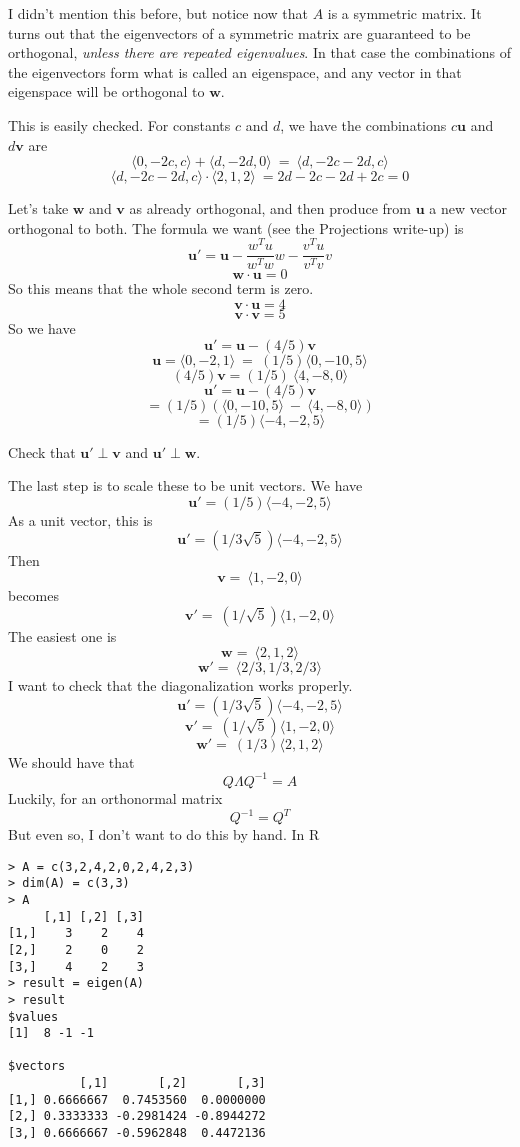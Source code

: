 \documentclass[11pt, oneside]{article}
\begin{document}
I didn't mention this before, but notice now that $A$ is a symmetric matrix.  It turns out that the eigenvectors of a symmetric matrix are guaranteed to be orthogonal, \emph{unless there are repeated eigenvalues}.  In that case the combinations of the eigenvectors form what is called an eigenspace, and any vector in that eigenspace will be orthogonal to $\mathbf{w}$.  

This is easily checked.  For constants $c$ and $d$, we have the combinations $c\mathbf{u}$ and $d\mathbf{v}$ are
\[  \langle 0,-2c,c \rangle  +  \langle d,-2d,0 \rangle  \ = \  \langle d,-2c-2d,c \rangle  \]
\[  \langle d,-2c-2d,c \rangle  \cdot  \langle 2,1,2 \rangle  \ = 2d - 2c - 2d + 2c = 0\]

Let's take $\mathbf{w}$ and $\mathbf{v}$ as already orthogonal, and then produce from $\mathbf{u}$ a new vector orthogonal to both.  The formula we want (see the Projections write-up) is
\[ \mathbf{u'} = \mathbf{u} - \frac{w^Tu}{w^Tw}w - \frac{v^Tu}{v^Tv}v \]
\[ \mathbf{w} \cdot \mathbf{u} = 0 \]
So this means that the whole second term is zero.
\[ \mathbf{v} \cdot \mathbf{u} = 4 \]
\[ \mathbf{v} \cdot \mathbf{v} = 5 \]
So we have
\[ \mathbf{u'} = \mathbf{u} - (4/5) \mathbf{v} \]
\[ \mathbf{u} =  \langle 0,-2,1 \rangle  \ = \ (1/5)  \langle 0,-10,5 \rangle  \]
\[ (4/5)\mathbf{v} = (1/5) \  \langle 4,-8,0 \rangle   \]
\[ \mathbf{u'} = \mathbf{u} - (4/5) \mathbf{v} \]
\[ = (1/5)( \langle 0,-10,5 \rangle \ -\  \langle 4,-8,0 \rangle ) \]
\[ = (1/5)  \langle -4,-2,5 \rangle  \]

Check that $\mathbf{u'} \perp \mathbf{v}$ and $\mathbf{u'} \perp \mathbf{w}$.

The last step is to scale these to be unit vectors.  We have 
\[ \mathbf{u'} = (1/5)  \langle -4,-2,5 \rangle  \]
As a unit vector, this is
\[ \mathbf{u'} = (1/3\sqrt{5})  \langle -4,-2,5 \rangle  \]
Then
\[ \mathbf{v} = \  \langle 1,-2,0 \rangle  \]
becomes
\[ \mathbf{v'} = \ (1/\sqrt{5})  \langle 1,-2,0 \rangle  \]
The easiest one is 
\[ \mathbf{w} = \  \langle 2,1,2 \rangle   \]
\[ \mathbf{w'} = \  \langle 2/3,1/3,2/3 \rangle   \]
I want to check that the diagonalization works properly.
\[ \mathbf{u'} = (1/3\sqrt{5})  \langle -4,-2,5 \rangle  \]
\[ \mathbf{v'} = \ (1/\sqrt{5})  \langle 1,-2,0 \rangle  \]
\[ \mathbf{w'} = \ (1/3)  \langle 2,1,2 \rangle   \]
We should have that
\[ Q \Lambda Q^{-1} = A \]
Luckily, for an orthonormal matrix
\[ Q^{-1} = Q^T \]
But even so, I don't want to do this by hand.  In R

\begin{verbatim}
> A = c(3,2,4,2,0,2,4,2,3)
> dim(A) = c(3,3)
> A
     [,1] [,2] [,3]
[1,]    3    2    4
[2,]    2    0    2
[3,]    4    2    3
> result = eigen(A)
> result
$values
[1]  8 -1 -1

$vectors
          [,1]       [,2]       [,3]
[1,] 0.6666667  0.7453560  0.0000000
[2,] 0.3333333 -0.2981424 -0.8944272
[3,] 0.6666667 -0.5962848  0.4472136
\end{verbatim}
\end{document}
